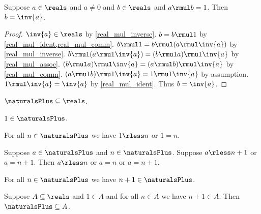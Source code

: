 \begin{theorem}\label{real_mul_inverse_unique}
    Suppose $a\in\reals$ and $a\neq 0$ and $b\in\reals$ and $a \rmul b = 1$.
    Then $b = \inv{a}$.
\end{theorem}
\begin{proof}
    $\inv{a}\in\reals$ by \cref{real_mul_inverse}.
    $b = b \rmul 1$ by \cref{real_mul_ident,real_mul_comm}.
    $b \rmul 1 = b \rmul (a \rmul \inv{a})$ by \cref{real_mul_inverse}.
    $b \rmul (a \rmul \inv{a}) = (b \rmul a) \rmul \inv{a}$ by \cref{real_mul_assoc}.
    $(b \rmul a) \rmul \inv{a} = (a \rmul b) \rmul \inv{a}$ by \cref{real_mul_comm}.
    $(a \rmul b) \rmul \inv{a} = 1 \rmul \inv{a}$ by assumption.
    $1 \rmul \inv{a} = \inv{a}$ by \cref{real_mul_ident}.
    Thus $b = \inv{a}$.
\end{proof}

\begin{axiom}\label{real_naturals_subset_reals}
    $\naturalsPlus \subseteq \reals$.
\end{axiom}

\begin{axiom}\label{real_one_in_naturals}
    $1\in\naturalsPlus$.
\end{axiom}

\begin{axiom}\label{real_one_leq_naturalsplus}
    For all $n\in\naturalsPlus$ we have $1 \rless n$ or $1 = n$.
\end{axiom}

\begin{axiom}\label{real_succ_discrete}
    Suppose $a\in\naturalsPlus$ and $n\in\naturalsPlus$.
    Suppose $a \rless n + 1$ or $a = n + 1$.
    Then $a \rless n$ or $a = n$ or $a = n + 1$.
\end{axiom}

\begin{axiom}\label{real_naturals_closed_succ}
    For all $n\in\naturalsPlus$ we have $n + 1\in\naturalsPlus$.
\end{axiom} 

\begin{axiom}\label{real_naturals_smallest}
    Suppose $A\subseteq\reals$ and $1\in A$ and for all $n\in A$ we have $n + 1\in A$.
    Then $\naturalsPlus \subseteq A$.
\end{axiom}

